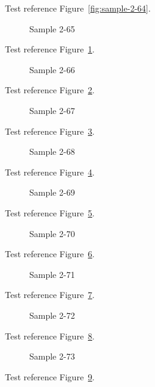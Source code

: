 Test reference Figure~\ref{fig:sample-2-64}.

\begin{figure}[tbhp]
\caption{Sample 2-65}
\label{fig:sample-2-65}
\end{figure}

Test reference Figure~\ref{fig:sample-2-65}.

\begin{figure}[tbhp]
\caption{Sample 2-66}
\label{fig:sample-2-66}
\end{figure}

Test reference Figure~\ref{fig:sample-2-66}.

\begin{figure}[tbhp]
\caption{Sample 2-67}
\label{fig:sample-2-67}
\end{figure}

Test reference Figure~\ref{fig:sample-2-67}.

\begin{figure}[tbhp]
\caption{Sample 2-68}
\label{fig:sample-2-68}
\end{figure}

Test reference Figure~\ref{fig:sample-2-68}.

\begin{figure}[tbhp]
\caption{Sample 2-69}
\label{fig:sample-2-69}
\end{figure}

Test reference Figure~\ref{fig:sample-2-69}.

\begin{figure}[tbhp]
\caption{Sample 2-70}
\label{fig:sample-2-70}
\end{figure}

Test reference Figure~\ref{fig:sample-2-70}.

\begin{figure}[tbhp]
\caption{Sample 2-71}
\label{fig:sample-2-71}
\end{figure}

Test reference Figure~\ref{fig:sample-2-71}.

\begin{figure}[tbhp]
\caption{Sample 2-72}
\label{fig:sample-2-72}
\end{figure}

Test reference Figure~\ref{fig:sample-2-72}.

\begin{figure}[tbhp]
\caption{Sample 2-73}
\label{fig:sample-2-73}
\end{figure}

Test reference Figure~\ref{fig:sample-2-73}.

